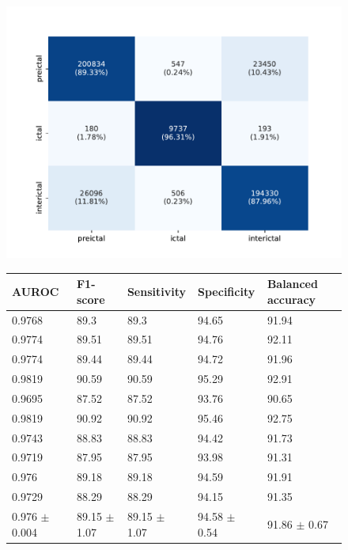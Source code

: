 \documentclass[a4paper,fleqn]{cas-sc}
\begin{document}
\begin{figure}[hbt]
  \hspace*{\fill}%
  \begin{minipage}[t]{0.45\textwidth}
    \centering
    \vspace{0pt}
    \includegraphics[scale=0.45]{figures/conf_lookback_1800.pdf}
    \label{fig:conf-matrix-1800}
  \end{minipage}%
  \begin{minipage}[t]{0.55\textwidth}
  \centering
  \vspace{0pt}
    \begin{tabular}{|p{0.5in}|p{0.5in}|p{0.5in}|p{0.5in}|p{0.5in}|}
    \hline
    AUROC & F1-score & Sensitivity & Specificity & Balanced \newline accuracy \\
    \hline
    0.9768 & 89.3 & 89.3 & 94.65 & 91.94 \\
    0.9774 & 89.51 & 89.51 & 94.76 & 92.11 \\
    0.9774 & 89.44 & 89.44 & 94.72 & 91.96 \\
    0.9819 & 90.59 & 90.59 & 95.29 & 92.91 \\
    0.9695 & 87.52 & 87.52 & 93.76 & 90.65 \\
    0.9819 & 90.92 & 90.92 & 95.46 & 92.75 \\
    0.9743 & 88.83 & 88.83 & 94.42 & 91.73 \\
    0.9719 & 87.95 & 87.95 & 93.98 & 91.31 \\
    0.976 & 89.18 & 89.18 & 94.59 & 91.91 \\
    0.9729 & 88.29 & 88.29 & 94.15 & 91.35 \\
    \hline
    0.976 \newline $\pm$ 0.004 & 89.15 \newline $\pm$ 1.07 & 89.15 \newline $\pm$ 1.07 & 94.58 \newline $\pm$ 0.54 & 91.86 \newline $\pm$ 0.67 \\
    \hline
\end{tabular}


\end{minipage}
\end{figure}
\end{document}
